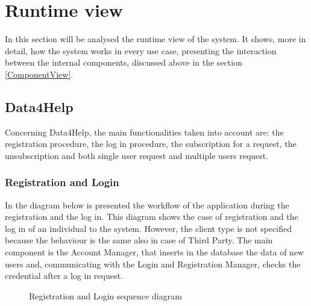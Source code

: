 \newpage

\section{Runtime view}
\label{RuntimeView}
    
In this section will be analysed the runtime view of the system. It shows, more in detail, how the system works in every use case, presenting the interaction between the internal components, discussed above in the section \ref{ComponentView}.

\subsection{Data4Help}

Concerning Data4Help, the main functionalities taken into account are: the registration procedure, the log in procedure, the subscription for a request, the unsubscription and both single user request and multiple users request.

\subsubsection{Registration and Login}
In the diagram below is presented the workflow of the application during the registration and the log in. This diagram shows the case of registration and the log in of an individual to the system. However, the client type is not specified because the behaviour is the same also in case of Third Party.
The main component is the Account Manager, that inserts in the database the data of new users and, communicating with the Login and Registration Manager, checks the credential after a log in request.

    
\begin{figure}[H]
    \centering
    \caption{Registration and Login sequence diagram}
    \label{fig:log&regDiagram}
\end{figure}

